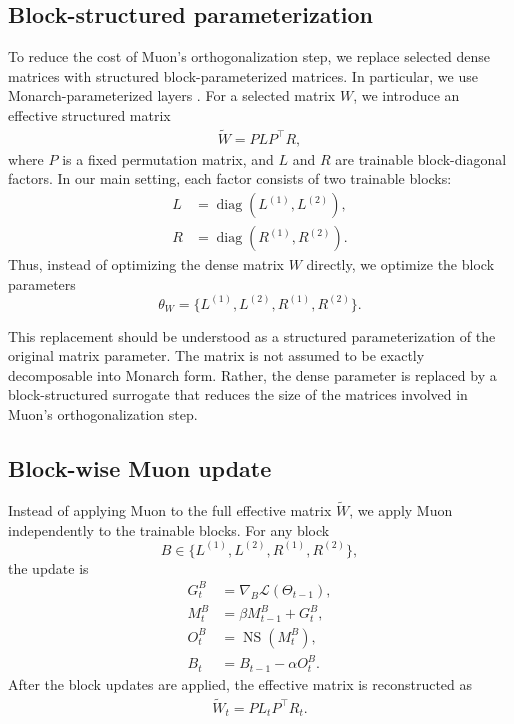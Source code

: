 \documentclass{article}
\begin{document}
\subsection{Block-structured parameterization}

To reduce the cost of Muon's orthogonalization step, we replace selected dense matrices with structured block-parameterized matrices. In particular, we use Monarch-parameterized layers \cite{dao2022monarchexpressivestructuredmatrices}. For a selected matrix \(W\), we introduce an effective structured matrix
\begin{align}
\widetilde{W} = P L P^\top R,
\end{align}
where \(P\) is a fixed permutation matrix, and \(L\) and \(R\) are trainable block-diagonal factors. In our main setting, each factor consists of two trainable blocks:
\begin{align}
L &= \operatorname{diag}(L^{(1)}, L^{(2)}), \\
R &= \operatorname{diag}(R^{(1)}, R^{(2)}).
\end{align}
Thus, instead of optimizing the dense matrix \(W\) directly, we optimize the block parameters
\[
\theta_W = \{L^{(1)}, L^{(2)}, R^{(1)}, R^{(2)}\}.
\]

This replacement should be understood as a structured parameterization of the original matrix parameter. The matrix is not assumed to be exactly decomposable into Monarch form. Rather, the dense parameter is replaced by a block-structured surrogate that reduces the size of the matrices involved in Muon's orthogonalization step.

\subsection{Block-wise Muon update}

Instead of applying Muon to the full effective matrix \(\widetilde{W}\), we apply Muon independently to the trainable blocks. For any block
\[
B \in \{L^{(1)}, L^{(2)}, R^{(1)}, R^{(2)}\},
\]
the update is
\begin{align}
G_t^B &= \nabla_B \mathcal{L}(\Theta_{t-1}), \\
M_t^B &= \beta M_{t-1}^B + G_t^B, \\
O_t^B &= \operatorname{NS}(M_t^B), \\
B_t &= B_{t-1} - \alpha O_t^B.
\end{align}
After the block updates are applied, the effective matrix is reconstructed as
\begin{align}
\widetilde{W}_t = P L_t P^\top R_t.
\end{align}
\end{document}
